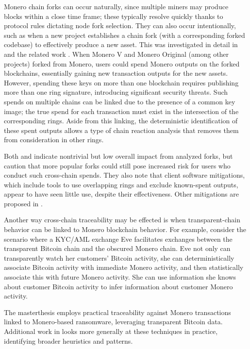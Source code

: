 \documentclass{article}
\theoremstyle{definition}
\begin{document}
Monero chain forks can occur naturally, since multiple miners may produce blocks within a close time frame; these typically resolve quickly thanks to protocol rules dictating node fork selection.
They can also occur intentionally, such as when a new project establishes a chain fork (with a corresponding forked codebase) to effectively produce a new asset.
This was investigated in detail in \cite{hinteregger2018monero} and the related work \cite{hinteregger2019short}.
When Monero V and Monero Original (among other projects) forked from Monero, users could spend Monero outputs on the forked blockchains, essentially gaining new transaction outputs for the new assets.
However, spending these keys on more than one blockchain requires publishing more than one ring signature, introducing significant security threats.
Such spends on multiple chains can be linked due to the presence of a common key image; the true spend for each transaction must exist in the intersection of the corresponding rings.
Aside from this linking, the deterministic identification of these spent outputs allows a type of chain reaction analysis that removes them from consideration in other rings.

Both \cite{hinteregger2018monero} and \cite{hinteregger2019short} indicate nontrivial but low overall impact from analyzed forks, but caution that more popular forks could still pose increased risk for users who conduct such cross-chain spends.
They also note that client software mitigations, which include tools to use overlapping rings and exclude known-spent outputs, appear to have seen little use, despite their effectiveness.
Other mitigations are proposed in \cite{wijaya2019unforkability}.

Another way cross-chain traceability may be effected is when transparent-chain behavior can be linked to Monero blockchain behavior.
For example, consider the scenario where a KYC/AML exchange Eve facilitates exchanges between the transparent Bitcoin chain and the obscured Monero chain.
Eve not only can transparently watch her customers' Bitcoin activity, she can deterministically associate Bitcoin activity with immediate Monero activity, and then statistically associate this with future Monero activity.
She can use information she knows about customer Bitcoin activity to infer information about customer Monero activity.

The masterthesis \cite{evenepoel2022tracing} employs practical traceability against Monero transactions linked to Monero-based ransomware, leveraging transparent Bitcoin data.
Additional work in \cite{yousaf2019tracing} looks more generally at these techniques in practice, identifying broader heuristics and patterns.
\end{document}
